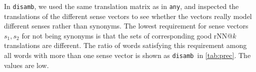 \documentclass[11pt]{article}
\newcommand{\any}{\texttt{any}}
\newcommand{\disamb}{\texttt{disamb}}
\begin{document}
In \disamb, we used the same translation matrix as in \any, and inspected the
translations of the different sense vectors to see whether the vectors really
model different senses rather than synonyms.
The lowest requirement for sense vectors $s_1, s_2$ for not being synonyms is
that the sets of corresponding good rNN@$k$ translations are different. The
ratio of words satisfying this requirement among all words with more than one
sense vector is shown as \disamb~in \cref{tab:prec}. The values are low.

\newcommand{\e}{$^E$}
\newcommand{\id}{$^I$}
\newcommand{\s}{$^S$}
\end{document}
